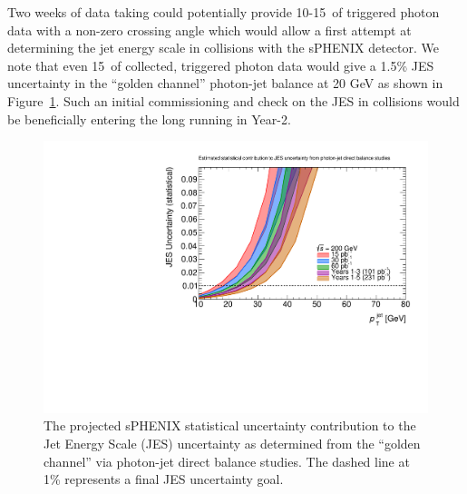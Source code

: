 Two weeks of data taking could potentially provide 10-15~\pb of triggered photon
\pp data with a non-zero crossing angle which would allow a first attempt 
at determining the jet energy scale in \pp collisions with the sPHENIX detector.
We note that even 15~\pb of collected, triggered photon data would give a 1.5\%
JES uncertainty in the ``golden channel'' photon-jet balance at 20 GeV as shown in Figure~\ref{fig:jes}.   Such an initial commissioning and check on the JES in \pp collisions would be beneficially entering the long \pp running in Year-2.

\begin{figure}
    \centering
    \includegraphics[width=0.8\linewidth]{figs/CompareSqrtsBUR.pdf}
    \caption{The projected sPHENIX statistical uncertainty contribution to the Jet Energy Scale (JES) uncertainty as determined from the ``golden channel'' via photon-jet direct balance studies.  The dashed line at 1\% represents a final JES uncertainty goal.}
    \label{fig:jes}
\end{figure}

